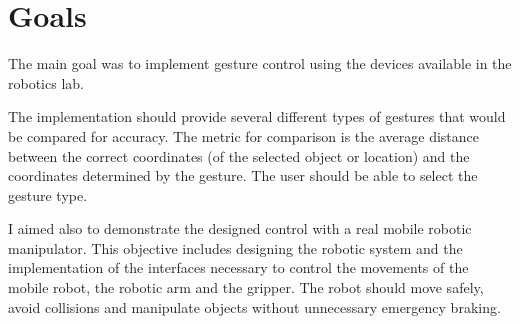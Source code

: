 \section{Goals}
The main goal was to implement gesture control using the devices available in the robotics lab.\par
The implementation should provide several different types of gestures that would be compared for accuracy. The metric for comparison is the average distance between the correct coordinates (of the selected object or location) and the coordinates determined by the gesture. The user should be able to select the gesture type.\par
I aimed also to demonstrate the designed control with a real mobile robotic manipulator. This objective includes designing the robotic system and the implementation of the interfaces necessary to control the movements of the mobile robot, the robotic arm and the gripper. 
The robot should move safely, avoid collisions and manipulate objects without unnecessary emergency braking.\par